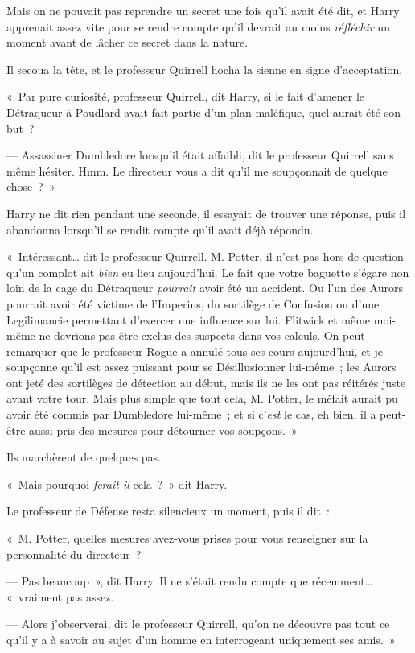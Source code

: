 Mais on ne pouvait pas reprendre un secret une fois qu'il avait été dit, et Harry apprenait assez vite pour se rendre compte qu'il devrait au moins \emph{réfléchir} un moment avant de lâcher ce secret dans la nature.

Il secoua la tête, et le professeur Quirrell hocha la sienne en signe d'acceptation.

«~Par pure curiosité, professeur Quirrell, dit Harry, si le fait d'amener le Détraqueur à Poudlard avait fait partie d'un plan maléfique, quel aurait été son but~?

--- Assassiner Dumbledore lorsqu'il était affaibli, dit le professeur Quirrell sans même hésiter.
Hmm. Le directeur vous a dit qu'il me soupçonnait de quelque chose~?~»

Harry ne dit rien pendant une seconde, il essayait de trouver une réponse, puis il abandonna lorsqu'il se rendit compte qu'il avait déjà répondu.

«~Intéressant… dit le professeur Quirrell.
M. Potter, il n'est pas hors de question qu'un complot ait \emph{bien} eu lieu aujourd'hui.
Le fait que votre baguette s'égare non loin de la cage du Détraqueur \emph{pourrait} avoir été un accident.
Ou l'un des Aurors pourrait avoir été victime de l'Imperius, du sortilège de Confusion ou d'une Legilimancie permettant d'exercer une influence sur lui.
Flitwick et même moi-même ne devrions pas être exclus des suspects dans vos calculs.
On peut remarquer que le professeur Rogue a annulé tous ses cours aujourd'hui, et je soupçonne qu'il est assez puissant pour se Désillusionner lui-même~; les Aurors ont jeté des sortilèges de détection au début, mais ils ne les ont pas réitérés juste avant votre tour.
Mais plus simple que tout cela, M. Potter, le méfait aurait pu avoir été commis par Dumbledore lui-même~; et si c'\emph{est} le cas, eh bien, il a peut-être aussi pris des mesures pour détourner vos soupçons.~»

Ils marchèrent de quelques pas.

«~Mais pourquoi \emph{ferait-il} cela~?~»
 dit Harry.

Le professeur de Défense resta silencieux un moment, puis il dit~:

«~M. Potter, quelles mesures avez-vous prises pour vous renseigner sur la personnalité du directeur~?

--- Pas beaucoup~», dit Harry.
Il ne s'était rendu compte que récemment…
«~vraiment pas assez.

--- Alors j'observerai, dit le professeur Quirrell, qu'on ne découvre pas tout ce qu'il y a à savoir au sujet d'un homme en interrogeant uniquement ses amis.~»

